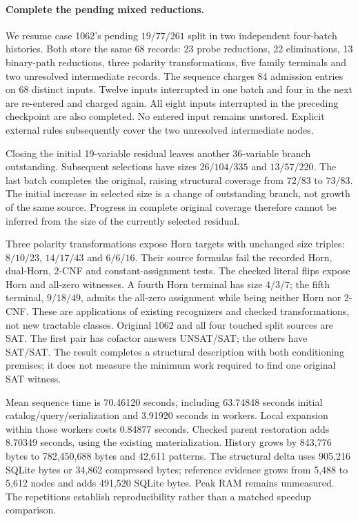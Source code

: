 \documentclass[11pt,a4paper]{article}
\numberwithin{equation}{section}
\theoremstyle{plain}
\theoremstyle{definition}
\theoremstyle{remark}
\begin{document}
\paragraph{Complete the pending mixed reductions.}
We resume case 1062's pending $19/77/261$ split in two independent four-batch
histories. Both store the same 68 records: 23 probe reductions, 22 eliminations,
13 binary-path reductions, three polarity transformations, five family terminals
and two unresolved intermediate records. The sequence charges 84 admission
entries on 68 distinct inputs. Twelve inputs interrupted in one batch and four
in the next are re-entered and charged again. All eight inputs interrupted in the
preceding checkpoint are also completed. No entered input remains unstored.
Explicit external rules subsequently cover the two unresolved intermediate nodes.

Closing the initial 19-variable residual leaves another 36-variable branch
outstanding. Subsequent selections have sizes $26/104/335$ and $13/57/220$.
The last batch completes the original, raising structural coverage from $72/83$
to $73/83$. The initial increase in selected size is a change of outstanding
branch, not growth of the same source. Progress in complete original coverage
therefore cannot be inferred from the size of the currently selected residual.

Three polarity transformations expose Horn targets with unchanged size triples:
$8/10/23$, $14/17/43$ and $6/6/16$. Their source formulas fail the recorded Horn,
dual-Horn, 2-CNF and constant-assignment tests. The checked literal flips expose
Horn and all-zero witnesses. A fourth Horn terminal has size $4/3/7$; the fifth
terminal, $9/18/49$, admits the all-zero assignment while being neither Horn nor
2-CNF. These are applications of existing recognizers and checked transformations,
not new tractable classes. Original 1062 and all four touched split sources are
SAT. The first pair has cofactor answers UNSAT/SAT; the others have SAT/SAT.
The result completes a structural description with both conditioning premises;
it does not measure the minimum work required to find one original SAT witness.

Mean sequence time is 70.46120 seconds, including
63.74848 seconds initial catalog/query/serialization and
3.91920 seconds in workers. Local expansion within those workers costs
0.84877 seconds. Checked parent restoration adds
8.70349 seconds, using the existing materialization. History grows by
843,776 bytes to 782,450,688 bytes and 42,611 patterns.
The structural delta uses 905,216 SQLite bytes or 34,862 compressed bytes;
reference evidence grows from 5,488 to 5,612 nodes and adds 491,520 SQLite bytes.
Peak RAM remains unmeasured. The repetitions establish reproducibility rather
than a matched speedup comparison.
\end{document}
